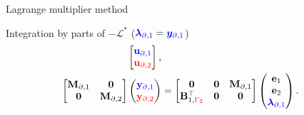 \documentclass[aspectratio=169]{ISAE-Beamer}
\begin{document}
\begin{frame}{Lagrange multiplier method}
{\begin{block}{Integration by parts of $-\mathcal{L}^*$ ($\textcolor{blue}{\bm{\lambda}_{\partial, 1}}=\textcolor{blue}{\bm{y}_{\partial, 1}}$) }
\begin{equation*}
\begin{aligned}
\begin{bmatrix}
						\textcolor{blue}{\mathbf{u}_{\partial, 1}} \\
						\textcolor{red}{\mathbf{u}_{\partial, 2}} \\
					\end{bmatrix}, \\
					\begin{bmatrix}
						\mathbf{M}_{\partial, 1} & \mathbf{0} \\
						\mathbf{0} & \mathbf{M}_{\partial, 2} \\
					\end{bmatrix}
					\begin{pmatrix}
						\textcolor{blue}{\mathbf{y}_{\partial, 1}} \\
						\textcolor{red}{\mathbf{y}_{\partial, 2}} \\
					\end{pmatrix}
					&= \begin{bmatrix}
						\mathbf{0} & \mathbf{0} & \mathbf{M}_{\partial, 1} \\
						\mathbf{B}_{1, \textcolor{red}{\Gamma_2}}^\top & \mathbf{0} & \mathbf{0} \\
					\end{bmatrix}\begin{pmatrix}
						\mathbf{e}_{1} \\
						\mathbf{e}_{2} \\
						\textcolor{blue}{\bm{\lambda}_{\partial, 1}} \\
					\end{pmatrix}.
				\end{aligned}
			\end{equation*}
		\end{block}	
	}
	

\end{frame}
\end{document}

